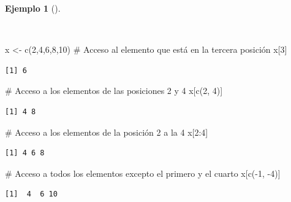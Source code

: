 \documentclass[
  spanish,
  a4paper,
]{scrreport}
\newenvironment{Shaded}{\begin{snugshade}}{\end{snugshade}}
\newcommand{\CommentTok}[1]{\textcolor[rgb]{0.37,0.37,0.37}{#1}}
\newcommand{\DecValTok}[1]{\textcolor[rgb]{0.68,0.00,0.00}{#1}}
\newcommand{\FunctionTok}[1]{\textcolor[rgb]{0.28,0.35,0.67}{#1}}
\newcommand{\NormalTok}[1]{\textcolor[rgb]{0.00,0.23,0.31}{#1}}
\newcommand{\OtherTok}[1]{\textcolor[rgb]{0.00,0.23,0.31}{#1}}
\newcommand{\SpecialCharTok}[1]{\textcolor[rgb]{0.37,0.37,0.37}{#1}}
\theoremstyle{definition}
\theoremstyle{definition}
\newtheorem{example}{Ejemplo}[chapter]
\theoremstyle{remark}
\begin{document}
\begin{example}[]\protect\hypertarget{exm-acceso-vector}{}\label{exm-acceso-vector}

~

\begin{Shaded}
\begin{Highlighting}[]
\NormalTok{x }\OtherTok{\textless{}{-}} \FunctionTok{c}\NormalTok{(}\DecValTok{2}\NormalTok{,}\DecValTok{4}\NormalTok{,}\DecValTok{6}\NormalTok{,}\DecValTok{8}\NormalTok{,}\DecValTok{10}\NormalTok{)}
\CommentTok{\# Acceso al elemento que está en la tercera posición}
\NormalTok{x[}\DecValTok{3}\NormalTok{]}
\end{Highlighting}
\end{Shaded}

\begin{verbatim}
[1] 6
\end{verbatim}

\begin{Shaded}
\begin{Highlighting}[]
\CommentTok{\# Acceso a los elementos de las posiciones 2 y 4}
\NormalTok{x[}\FunctionTok{c}\NormalTok{(}\DecValTok{2}\NormalTok{, }\DecValTok{4}\NormalTok{)]}
\end{Highlighting}
\end{Shaded}

\begin{verbatim}
[1] 4 8
\end{verbatim}

\begin{Shaded}
\begin{Highlighting}[]
\CommentTok{\# Acceso a los elementos de la posición 2 a la 4}
\NormalTok{x[}\DecValTok{2}\SpecialCharTok{:}\DecValTok{4}\NormalTok{]}
\end{Highlighting}
\end{Shaded}

\begin{verbatim}
[1] 4 6 8
\end{verbatim}

\begin{Shaded}
\begin{Highlighting}[]
\CommentTok{\# Acceso a todos los elementos excepto el primero y el cuarto}
\NormalTok{x[}\FunctionTok{c}\NormalTok{(}\SpecialCharTok{{-}}\DecValTok{1}\NormalTok{, }\SpecialCharTok{{-}}\DecValTok{4}\NormalTok{)]}
\end{Highlighting}
\end{Shaded}

\begin{verbatim}
[1]  4  6 10
\end{verbatim}

\end{example}
\end{document}
